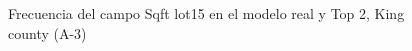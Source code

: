 \begin{figure}[H]
    \centering
    
    \caption{Frecuencia del campo Sqft lot15 en el modelo real y Top 2, King county (A-3)}
    \label{frecuency-top2-sqft lot15}
\end{figure}